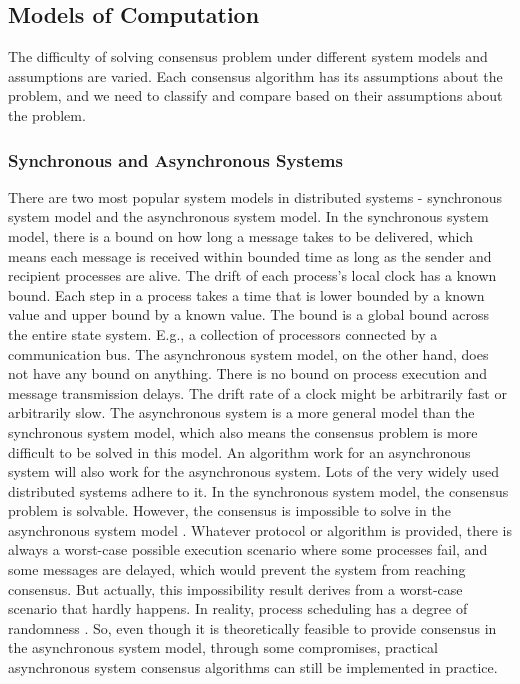 \documentclass[12pt, a4paper]{article}
\begin{document}
\subsection{Models of Computation}

The difficulty of solving consensus problem under different system models and
assumptions are varied. Each consensus algorithm has its assumptions about the
problem, and we need to classify and compare based on their assumptions about
the problem.

\subsubsection{Synchronous and Asynchronous Systems}

There are two most popular system models in distributed systems - synchronous
system model and the asynchronous system model. In the synchronous system model,
there is a bound on how long a message takes to be delivered, which means each
message is received within bounded time as long as the sender and recipient
processes are alive. The drift of each process's local clock has a known bound.
Each step in a process takes a time that is lower bounded by a known value and
upper bound by a known value. The bound is a global bound across the entire
state system. E.g., a collection of processors connected by a communication bus.
The asynchronous system model, on the other hand, does not have any bound on
anything. There is no bound on process execution and message transmission
delays. The drift rate of a clock might be arbitrarily fast or arbitrarily slow.
The asynchronous system is a more general model than the synchronous system
model, which also means the consensus problem is more difficult to be solved in
this model. An algorithm work for an asynchronous system will also work for the
asynchronous system. Lots of the very widely used distributed systems adhere to
it. In the synchronous system model, the consensus problem is solvable. However,
the consensus is impossible to solve in the asynchronous system model
\cite{fischer1985impossibility}. Whatever protocol or algorithm is provided,
there is always a worst-case possible execution scenario where some processes
fail, and some messages are delayed, which would prevent the system from
reaching consensus. But actually, this impossibility result derives from a
worst-case scenario that hardly happens. In reality, process scheduling has a
degree of randomness \cite{aguilera2010stumbling}. So, even though it is
theoretically feasible to provide consensus in the asynchronous system model,
through some compromises, practical asynchronous system consensus algorithms can
still be implemented in practice.
\end{document}
